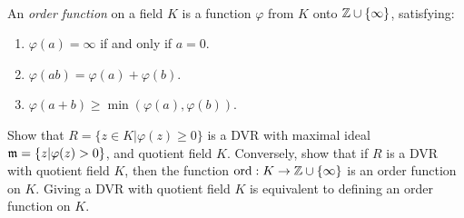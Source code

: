 \begin{solution}
    \td  \\
\end{solution}

\begin{exercise}
    An \textit{order function} on a field $K$ is a function $\varphi$ from $K$ onto $\mathbb{Z} \cup \{\infty\}$, satisfying:
    \begin{enumerate}
        \item[(i)] $\varphi(a) = \infty$ if and only if $a = 0$.
        \item[(ii)] $\varphi(ab) = \varphi(a) + \varphi(b)$.
        \item[(iii)] $\varphi(a + b) \geq \min(\varphi(a), \varphi(b))$.  
    \end{enumerate}
    Show that $R = \{z \in K | \varphi(z) \geq 0\}$ is a DVR with maximal ideal $\mathfrak{m} = \{z | \varphi(z) > 0\}$, and quotient field $K$. Conversely, show that if $R$ is a DVR with quotient field $K$, then the function $\text{ord}: K \to \mathbb{Z}\cup \{\infty\}$ is an order function on $K$. Giving a DVR with quotient field $K$ is equivalent to defining an order function on $K$. \\
\end{exercise}

\begin{solution}
    \td \\
\end{solution}

\begin{exercise}
    \td \\
\end{exercise}

\begin{solution}
    \td \\
\end{solution}

\begin{exercise}
    \td \\
\end{exercise}

\begin{solution}
    \td \\
\end{solution}

\begin{exercise}
    \td \\
\end{exercise}

\begin{solution}
    \td \\
\end{solution}

\begin{exercise}
    \td \\
\end{exercise}

\begin{solution}
    \td \\
\end{solution}

